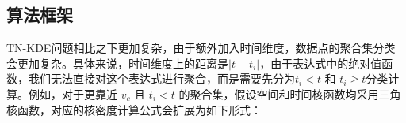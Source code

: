 











\subsection{算法框架}
\label{sec3.3:framework}

TN-KDE问题相比之下更加复杂，由于额外加入时间维度，数据点的聚合集分类会更加复杂。具体来说，时间维度上的距离是$\vert t - t_i \vert$，由于表达式中的绝对值函数，我们无法直接对这个表达式进行聚合，而是需要先分为$t_i < t$ 和 $t_i \ge t$分类计算。例如，对于更靠近 $v_c$ 且 $t_i < t$ 的聚合集，假设空间和时间核函数均采用三角核函数，对应的核密度计算公式会扩展为如下形式：

